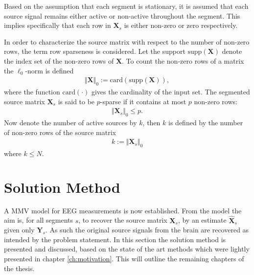 Based on the assumption that each segment is stationary, it is assumed that each source signal remains either active or non-active throughout the segment. This implies specifically that each row in $\mathbf{X}_s$ is either non-zero or zero respectively.   

In order to characterize the source matrix with respect to the number of non-zero rows, the term row sparseness is considered. 
Let the support $\text{supp}(\mathbf{X})$ denote the index set of the non-zero rows of $\mathbf{X}$.
To count the non-zero rows of a matrix the $\ell_0$-norm is defined 
\begin{align*}
\Vert \mathbf{X} \Vert_0 := \text{card}(\text{supp}(\mathbf{X})),
\end{align*}
where the function $\text{card}(\cdot)$ gives the cardinality of the input set. The segmented source matrix $\mathbf{X}_s$ is said to be $p$-sparse if it contains at most $p$ non-zero rows:
\begin{align*}
\Vert \mathbf{X}_s \Vert_0 \leq p.
\end{align*}
Now denote the number of active sources by $k$, then $k$ is defined by the number of non-zero rows of the source matrix 
\begin{align*}
k := \Vert \mathbf{X}_s \Vert_0
\end{align*} 
where $k \leq N$. 

\section{Solution Method}\label{sec:sol_met}
A MMV model for EEG measurements is now established.
From the model the aim is, for all segments $s$, to recover the source matrix $\mathbf{X}_s$, by an estimate $\hat{\mathbf{X}}_s$ given only $\mathbf{Y}_s$.
As such the original source signals from the brain are recovered as intended by the problem statement. 
In this section the solution method is presented and discussed, based on the state of the art methods which were lightly presented in chapter \ref{ch:motivation}. This will outline the remaining chapters of the thesis. 

